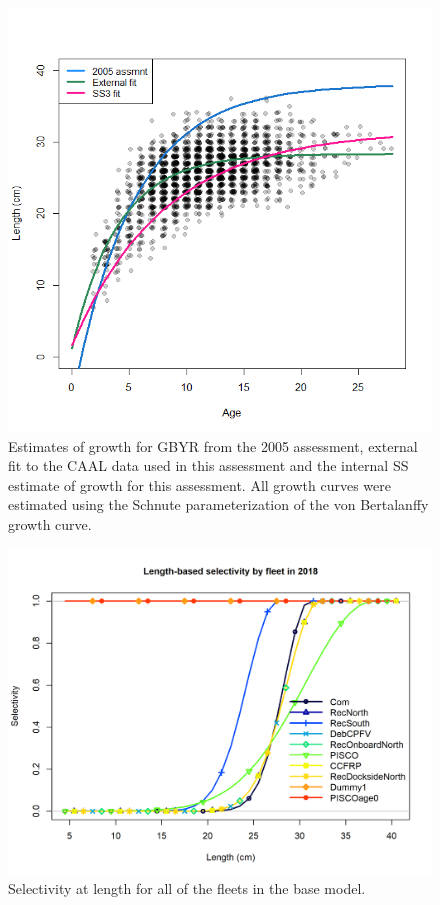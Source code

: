 \documentclass[12pt,]{article}
\begin{document}
\FloatBarrier

\begin{figure}
\centering
\includegraphics{Figures/growth_compare.png}
\caption{Estimates of growth for GBYR from the 2005 assessment, external
fit to the CAAL data used in this assessment and the internal SS
estimate of growth for this assessment. All growth curves were estimated
using the Schnute parameterization of the von Bertalanffy growth curve.
\label{fig:growth_compare}}
\end{figure}

\FloatBarrier

\begin{figure}
\centering
\includegraphics{r4ss/plots_mod1/sel01_multiple_fleets_length1.png}
\caption{Selectivity at length for all of the fleets in the base model.
\label{fig:sel01_multiple_fleets_length1}}
\end{figure}
\end{document}
